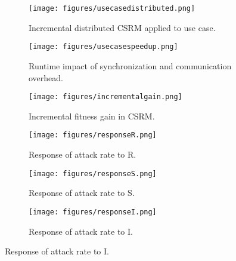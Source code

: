 \begin{figure}
    \begin{subfigure}{0.5\textwidth}
        \texttt{[image: figures/usecasedistributed.png]}
		\caption{Incremental distributed CSRM applied to use case.}
		\label{fig:usecasedistributed}
    \end{subfigure}
    \begin{subfigure}{0.5\textwidth}
        \texttt{[image: figures/usecasespeedup.png]}
		\caption{Runtime impact of synchronization and communication overhead.}
		\label{fig:usecasespeedup}
    \end{subfigure}
        \begin{subfigure}{0.5\textwidth}
        \texttt{[image: figures/incrementalgain.png]}
        \caption{Incremental fitness gain in CSRM.}
        \label{fig:incrementalgain}
    \end{subfigure}
        \begin{subfigure}{0.5\textwidth}
        \texttt{[image: figures/responseR.png]}
        \caption{Response of attack rate to R.}
    \end{subfigure}
    \begin{subfigure}{0.5\textwidth}
        \texttt{[image: figures/responseS.png]}
        \caption{Response of attack rate to S.}
    \end{subfigure}
        \begin{subfigure}{0.5\textwidth}
        \texttt{[image: figures/responseI.png]}
        \caption{Response of attack rate to I.}
        \label{fig:usecaseresponseplots}
    \end{subfigure}
\end{figure}

